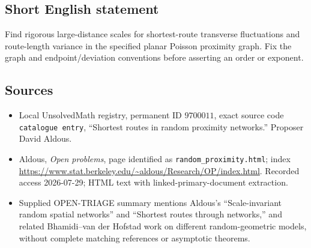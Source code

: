 \documentclass[11pt]{article}
\begin{document}
\subsection{Short English statement}
Find rigorous large-distance scales for shortest-route transverse fluctuations and route-length variance in the specified planar Poisson proximity graph. Fix the graph and endpoint/deviation conventions before asserting an order or exponent.
\subsection{Sources}
\begin{itemize}
\item Local UnsolvedMath registry, permanent ID \(9700011\), exact source code \texttt{catalogue entry}, ``Shortest routes in random proximity networks.'' Proposer David Aldous.
\item Aldous, \emph{Open problems}, page identified as \texttt{random\_proximity.html}; index \url{https://www.stat.berkeley.edu/~aldous/Research/OP/index.html}. Recorded access 2026-07-29; HTML text with linked-primary-document extraction.
\item Supplied OPEN-TRIAGE summary mentions Aldous's ``Scale-invariant random spatial networks'' and ``Shortest routes through networks,'' and related Bhamidi--van der Hofstad work on different random-geometric models, without complete matching references or asymptotic theorems.
\end{itemize}
\end{document}
